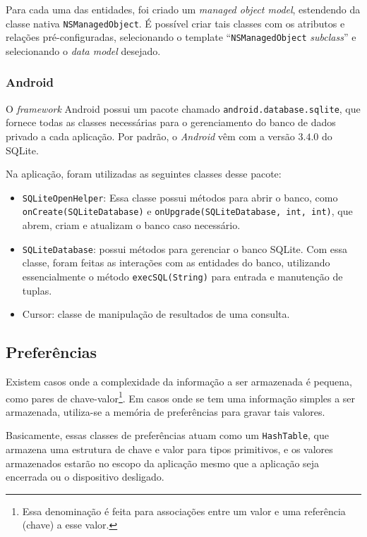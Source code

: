 			Para cada uma das entidades, foi criado um \emph{managed object model}, estendendo da classe nativa \texttt{NSManagedObject}. É possível criar tais classes com os atributos e relações pré-configuradas, selecionando o template ``\texttt{NSManagedObject} \emph{subclass}''  e selecionando o \emph{data model} desejado.
     
    \subsubsection{Android}
     
    O \emph{framework} Android possui um pacote chamado \texttt{android.database.sqlite}, que fornece todas as classes necessárias para o gerenciamento do banco de dados privado a cada aplicação. Por padrão, o \emph{Android} vêm com a versão $3.4.0$ do SQLite.
    
	Na aplicação, foram utilizadas as seguintes classes desse pacote:
\begin{itemize}
\item \texttt{SQLiteOpenHelper}: Essa classe possui métodos para abrir o banco, como \texttt{onCreate(SQLiteDatabase)} e \texttt{onUpgrade(SQLiteDatabase, int, int)}, que abrem, criam e atualizam o banco caso necessário.
\item \texttt{SQLiteDatabase}: possui métodos para gerenciar o banco SQLite. Com essa classe, foram feitas as interações com as entidades do banco, utilizando essencialmente o método \texttt{execSQL(String)} para entrada e manutenção de tuplas.
\item Cursor: classe de manipulação de resultados de uma consulta.
\end{itemize}     
     
    \subsection {Preferências}
            Existem casos onde a complexidade da informação a ser armazenada é pequena, como pares de chave-valor\footnote{Essa denominação é feita para associações entre um valor e uma referência (chave) a esse valor.}. Em casos onde se tem uma informação simples a ser armazenada, utiliza-se a memória de preferências para gravar tais valores.
            
			Basicamente, essas classes de preferências atuam como um \texttt{HashTable}, que armazena uma estrutura de chave e valor para tipos primitivos, e os valores armazenados estarão no escopo da aplicação mesmo que a aplicação seja encerrada ou o dispositivo desligado.
           
